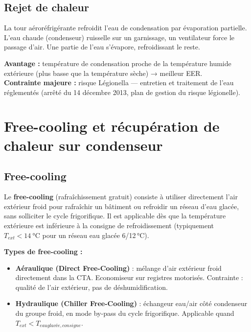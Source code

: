 \subsection{Rejet de chaleur}

\begin{definition}[title=Tour aéroréfrigérante (TAR)]
La tour aéroréfrigérante refroidit l'eau de condensation par évaporation partielle. L'eau chaude (condenseur) ruisselle sur un garnissage, un ventilateur force le passage d'air. Une partie de l'eau s'évapore, refroidissant le reste.

\textbf{Avantage :} température de condensation proche de la température humide extérieure (plus basse que la température sèche) → meilleur EER.\\
\textbf{Contrainte majeure :} risque Légionella — entretien et traitement de l'eau réglementés (arrêté du 14 décembre 2013, plan de gestion du risque légionelle).
\end{definition}

\section{Free-cooling et récupération de chaleur sur condenseur}

\subsection{Free-cooling}

\begin{definition}[title=Free-cooling]
Le \textbf{free-cooling} (rafraîchissement gratuit) consiste à utiliser directement l'air extérieur froid pour rafraîchir un bâtiment ou refroidir un réseau d'eau glacée, sans solliciter le cycle frigorifique. Il est applicable dès que la température extérieure est inférieure à la consigne de refroidissement (typiquement $T_{ext} < \SI{14}{\degreeCelsius}$ pour un réseau eau glacée 6/12\,°C).
\end{definition}

\textbf{Types de free-cooling :}
\begin{itemize}
  \item \textbf{Aéraulique (Direct Free-Cooling)} : mélange d'air extérieur froid directement dans la CTA. Economiseur sur registres motorisés. Contrainte : qualité de l'air extérieur, pas de déshumidification.
  \item \textbf{Hydraulique (Chiller Free-Cooling)} : échangeur eau/air côté condenseur du groupe froid, en mode by-pass du cycle frigorifique. Applicable quand $T_{ext} < T_{eau glacée,consigne}$.
\end{itemize}

